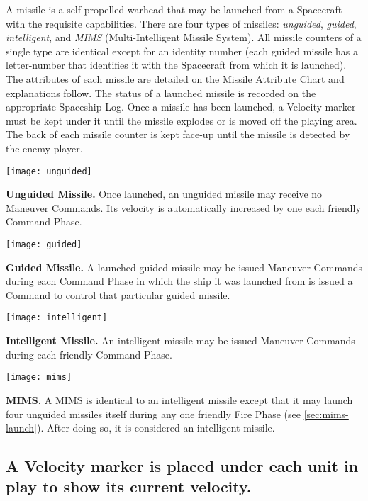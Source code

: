 A missile is a self-propelled warhead that may be launched from a
Spacecraft with the requisite capabilities. There are four types of
missiles: \emph{unguided}, \emph{guided}, \emph{intelligent}, and
\emph{MIMS} (Multi-Intelligent Missile System). All missile counters
of a single type are identical except for an identity number (each
guided missile has a letter-number that identifies it with the
Spacecraft from which it is launched). The attributes of each missile
are detailed on the Missile Attribute Chart and explanations follow.
The status of a launched missile is recorded on the appropriate
Spaceship Log. Once a missile has been launched, a Velocity marker
must be kept under it until the missile explodes or is moved off the
playing area. The back of each missile counter is kept face-up until
the missile is detected by the enemy player.

\bigskip

\texttt{[image: unguided]}
\parbox{0.5\textwidth}{\textbf{Unguided Missile.} Once launched, an
  unguided missile may receive no Maneuver Commands. Its velocity is
  automatically increased by one each friendly Command Phase.}

\bigskip

\texttt{[image: guided]}
\parbox{0.5\textwidth}{\textbf{Guided Missile.} A launched guided
  missile may be issued Maneuver Commands during each Command Phase in
  which the ship it was launched from is issued a Command to control
  that particular guided missile.}


\bigskip

\texttt{[image: intelligent]}
\parbox{0.5\textwidth}{\textbf{Intelligent Missile.} An intelligent
  missile may be issued Maneuver Commands during each friendly Command
  Phase.}


\bigskip

\texttt{[image: mims]}
\parbox{0.5\textwidth}{\textbf{MIMS.} A MIMS is identical to an
  intelligent missile except that it may launch four unguided missiles
  itself during any one friendly Fire Phase (see \ref{sec:mims-launch}).
  After doing so, it is considered an intelligent missile.}


\subsection[Velocity Marker]{A Velocity marker is placed under each
  unit in play to 
  show its current velocity.}
\label{sec:velocity-marker}





